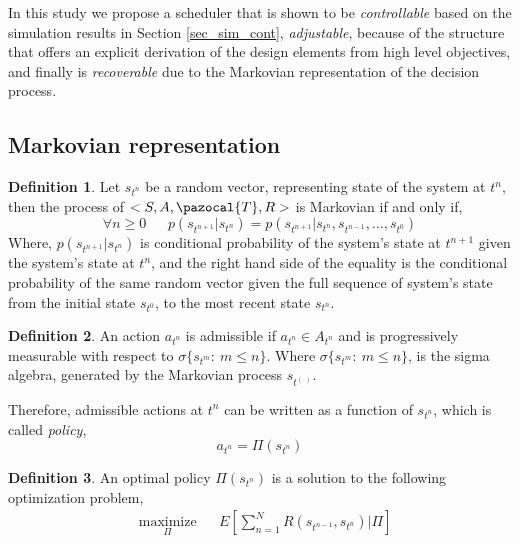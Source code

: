 \documentclass[12pt]{article}
\theoremstyle{definition}
\newtheorem{defn}{Definition}
\begin{document}
In this study we propose a scheduler that is shown to be \textit{controllable} based on the simulation results in Section \ref{sec_sim_cont}, \textit{adjustable}, because of the structure that offers an explicit derivation of the design elements from high level objectives, and finally is \textit{recoverable} due to the Markovian representation of the decision process.

\subsection{Markovian representation}
\begin{defn} 
Let $s_{t^n}$ be a random vector, representing state of the system at $t^n$, then the process of  $<S, A, \pazocal{T}, R>$  is Markovian if and only if,\\
\begin{equation*}
\forall n\geq 0 ~~~~~~~p(s_{t^{n+1}} | s_{t^n}) = p(s_{t^{n+1}} | s_{t^n}, s_{t^{n-1}},\dots, s_{t^0})  
\end{equation*}
Where, $p(s_{t^{n+1}} | s_{t^n})$  is conditional probability of the system's state at $t^{n+1}$ given the system's state at $t^n$, and the right hand side of the equality is the conditional probability of the same random vector given the full sequence of system's state from the initial state $s_{t^0}$, to the most recent state $s_{t^n}$.
\end{defn}

\begin{defn}
An action $a_{t^n}$ is admissible if $a_{t^n} \in A_{t^n}$ and is progressively measurable with respect to $\sigma\{s_{t^m}:~m \leq n\}$. Where $\sigma\{s_{t^m}:~m \leq n\}$, is the sigma algebra, generated by the Markovian process $s_{t^{(.)}}$.
\end{defn}

Therefore, admissible actions at $t^n$ can be written as a function of $s_{t^n}$, which is called \textit{policy},
\begin{equation*}
a_{t^n} = \Pi(s_{t^n})
\end{equation*}

\begin{defn}
An optimal policy $\Pi(s_{t^n})$ is a solution to the following optimization problem,
\begin{equation}\label{equ_opt1}
\begin{aligned}
& \underset{\Pi}{\text{maximize}}
& & E[\sum_{n=1}^{N} R(s_{t^{n-1}}, s_{t^n}) | \Pi] 
\end{aligned}
\end{equation}
\end{defn}
\end{document}
